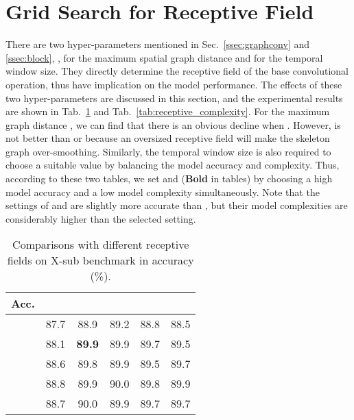 \documentclass[10pt,journal,compsoc]{IEEEtran}
\begin{document}
\section{Grid Search for Receptive Field}
\label{asec:receptive}

There are two hyper-parameters mentioned in Sec.~\ref{ssec:graphconv} and \ref{ssec:block}, \ie,  for the maximum spatial graph distance and  for the temporal window size. They directly determine the receptive field of the base convolutional operation, thus have implication on the model performance. The effects of these two hyper-parameters are discussed in this section, and the experimental results are shown in Tab.~\ref{tab:receptive_acc} and Tab.~\ref{tab:receptive_complexity}. For the maximum graph distance , we can find that there is an obvious decline when . However,  is not better than  or  because an oversized receptive field will make the skeleton graph over-smoothing. Similarly, the temporal window size  is also required to choose a suitable value by balancing the model accuracy and complexity. Thus, according to these two tables, we set  and  ({\bf Bold} in tables) by choosing a high model accuracy and a low model complexity simultaneously. Note that the settings of  and  are slightly more accurate than , but their model complexities are considerably higher than the selected setting.

\begin{table}[ht]
  \caption{Comparisons with different receptive fields on X-sub benchmark in accuracy (\%).}
  \label{tab:receptive_acc}
  \vspace{-0.4cm}
  \centering
  \setlength{\tabcolsep}{4pt}
  \renewcommand{\arraystretch}{1.2}
  \begin{tabular}{c|ccccc}
  \toprule
  Acc. &  &  &  &  &  \\
  \midrule
   & 87.7 & 88.9 & 89.2 & 88.8 & 88.5 \\
   & 88.1 & {\bf 89.9} & 89.9 & 89.7 & 89.5 \\
   & 88.6 & 89.8 & 89.9 & 89.5 & 89.7 \\
   & 88.8 & 89.9 & 90.0 & 89.8 & 89.9 \\
   & 88.7 & 90.0 & 89.9 & 89.7 & 89.7 \\
  \bottomrule
  \end{tabular}
\end{table}
\end{document}
